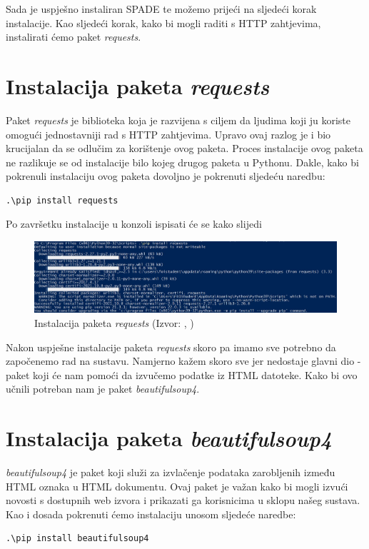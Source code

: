 \documentclass[]{foi} %
\begin{document}
Sada je uspješno instaliran SPADE te možemo prijeći na sljedeći korak instalacije. Kao sljedeći korak, kako bi mogli raditi s HTTP zahtjevima, instalirati ćemo paket \textit{requests}.

\section{Instalacija paketa \textit{requests}}
Paket \textit{requests} je biblioteka koja je razvijena s ciljem da ljudima koji ju koriste omogući jednostavniji rad s HTTP zahtjevima. Upravo ovaj razlog je i bio krucijalan da se odlučim za korištenje ovog paketa. Proces instalacije ovog paketa ne razlikuje se od instalacije bilo kojeg drugog paketa u Pythonu. Dakle, kako bi pokrenuli instalaciju ovog paketa dovoljno je pokrenuti sljedeću naredbu:\begin{verbatim}.\pip install requests\end{verbatim} Po završetku instalacije u konzoli ispisati će se kako slijedi

\begin{figure}[h!]
    \centering
    \includegraphics[width=1.0\textwidth]{slike/requests-install.jpg}
    \caption{Instalacija paketa \textit{requests} (Izvor: \citeauthor{ispisInstalacijeRequests}, \citeyear{ispisInstalacijeRequests})}
    \label{fig:instalacijaRequests}
\end{figure}

Nakon uspješne instalacije paketa \textit{requests} skoro pa imamo sve potrebno da započenemo rad na sustavu. Namjerno kažem skoro sve jer nedostaje glavni dio - paket koji će nam pomoći da izvučemo podatke iz HTML datoteke. Kako bi ovo učnili potreban nam je paket \textit{beautifulsoup4}.

\section{Instalacija paketa \textit{beautifulsoup4}}
\textit{beautifulsoup4} je paket koji služi za izvlačenje podataka zarobljenih između HTML oznaka u HTML dokumentu. Ovaj paket je važan kako bi mogli izvući novosti s dostupnih web izvora i prikazati ga korisnicima u sklopu našeg sustava. Kao i dosada pokrenuti ćemo instalaciju unosom sljedeće naredbe:\begin{verbatim}.\pip install beautifulsoup4\end{verbatim}
\end{document}
